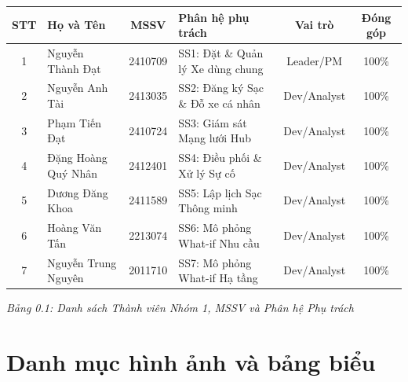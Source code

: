 \documentclass[12pt,a4paper]{article}
\begin{document}
\setcounter{page}{1}
\newpage

\vspace*{\fill}
\begin{center}
    \renewcommand{\arraystretch}{1.45}
    \begin{tabularx}{\textwidth}{|c|X|c|X|c|c|}
        \hline
        \textbf{STT} & \textbf{Họ và Tên} & \textbf{MSSV} & \textbf{Phân hệ phụ trách} & \textbf{Vai trò} & \textbf{Đóng góp} \\
        \hline
        1 & Nguyễn Thành Đạt & 2410709 & SS1: Đặt \& Quản lý Xe dùng chung & Leader/PM & 100\% \\
        \hline
        2 & Nguyễn Anh Tài & 2413035 & SS2: Đăng ký Sạc \& Đỗ xe cá nhân & Dev/Analyst & 100\% \\
        \hline
        3 & Phạm Tiến Đạt & 2410724 & SS3: Giám sát Mạng lưới Hub & Dev/Analyst & 100\% \\
        \hline
        4 & Đặng Hoàng Quý Nhân & 2412401 & SS4: Điều phối \& Xử lý Sự cố & Dev/Analyst & 100\% \\
        \hline
        5 & Dương Đăng Khoa & 2411589 & SS5: Lập lịch Sạc Thông minh & Dev/Analyst & 100\% \\
        \hline
        6 & Hoàng Văn Tấn & 2213074 & SS6: Mô phỏng What-if Nhu cầu & Dev/Analyst & 100\% \\
        \hline
        7 & Nguyễn Trung Nguyên & 2011710 & SS7: Mô phỏng What-if Hạ tầng & Dev/Analyst & 100\% \\
        \hline
    \end{tabularx}
    \vspace{0.3cm}
    
    \textit{Bảng 0.1: Danh sách Thành viên Nhóm 1, MSSV và Phân hệ Phụ trách}
\end{center}
\vspace*{\fill}
\newpage

\tableofcontents
\newpage

\section*{Danh mục hình ảnh và bảng biểu}
\end{document}
